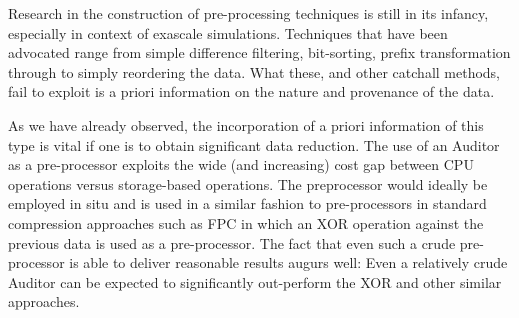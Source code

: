 Research in the construction of pre-processing techniques is still in its
infancy, especially in context of exascale simulations. Techniques that have
been advocated range from simple difference filtering, bit-sorting, prefix
transformation through to simply reordering the data.  What these, and other
catchall methods, fail to exploit is a priori information on the nature and
provenance of the data.

As we have already observed, the incorporation of a priori information of this
type is vital if one is to obtain significant data reduction. The use of an
Auditor as a pre-processor exploits the wide (and increasing) cost gap between
CPU operations versus storage-based operations. The preprocessor would ideally
be employed in situ and is used in a similar fashion to pre-processors in
standard compression approaches such as FPC \cite{BurtscherFPC} in which an XOR
operation against the previous data is used as a pre-processor. The fact that
even such a crude pre- processor is able to deliver reasonable results augurs
well: Even a relatively crude Auditor can be expected to significantly
out-perform the XOR and other similar approaches.







